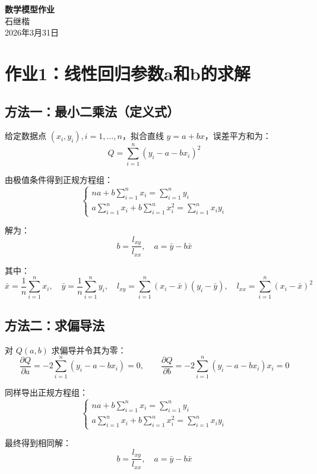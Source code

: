 \documentclass{article}
\begin{document}
	
	\begin{center}
		{\LARGE \textbf{数学模型作业}} \\[0.5cm]
		{\large 石继楷 } \\[0.3cm]
		{\large 2026年3月31日}
	\end{center}
	
	\section{作业1：线性回归参数a和b的求解}
	
	\subsection{方法一：最小二乘法（定义式）}
	
	给定数据点 $(x_i, y_i), i=1,\dots,n$，拟合直线 $y = a + bx$，误差平方和为：
	\[
	Q = \sum_{i=1}^n (y_i - a - bx_i)^2
	\]
	
	由极值条件得到正规方程组：
	\[
	\begin{cases}
		na + b\sum_{i=1}^n x_i = \sum_{i=1}^n y_i \\[8pt]
		a\sum_{i=1}^n x_i + b\sum_{i=1}^n x_i^2 = \sum_{i=1}^n x_i y_i
	\end{cases}
	\]
	
	解为：
	\[
	b = \frac{l_{xy}}{l_{xx}},\quad a = \bar{y} - b\bar{x}
	\]
	
	其中：
	\[
	\bar{x} = \frac{1}{n}\sum_{i=1}^n x_i,\quad \bar{y} = \frac{1}{n}\sum_{i=1}^n y_i,\quad l_{xy} = \sum_{i=1}^n (x_i - \bar{x})(y_i - \bar{y}),\quad l_{xx} = \sum_{i=1}^n (x_i - \bar{x})^2
	\]
	
	\subsection{方法二：求偏导法}
	
	对 $Q(a,b)$ 求偏导并令其为零：
	\[
	\frac{\partial Q}{\partial a} = -2\sum_{i=1}^n (y_i - a - bx_i) = 0,\qquad 
	\frac{\partial Q}{\partial b} = -2\sum_{i=1}^n (y_i - a - bx_i)x_i = 0
	\]
	
	同样导出正规方程组：
	\[
	\begin{cases}
		na + b\sum_{i=1}^n x_i = \sum_{i=1}^n y_i \\[8pt]
		a\sum_{i=1}^n x_i + b\sum_{i=1}^n x_i^2 = \sum_{i=1}^n x_i y_i
	\end{cases}
	\]
	
	最终得到相同解：
	\[
	b = \frac{l_{xy}}{l_{xx}},\quad a = \bar{y} - b\bar{x}
	\]
	
\end{document}
